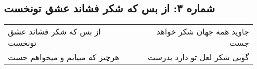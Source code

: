 \begin{center}
\section*{شماره ۳: از بس که شکر فشاند عشق تونخست}
\label{sec:003}
\begin{longtable}{l p{0.5cm} r}
از بس که شکر فشاند عشق تونخست
&&
جاوید همه جهان شکر خواهد جست
\\
هرچیز که مییابم و میخواهم جست
&&
گویی شکر لعل تو دارد بدرست
\\
\end{longtable}
\end{center}

